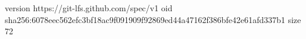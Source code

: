version https://git-lfs.github.com/spec/v1
oid sha256:6078eec562efc3bf18ac9f091909f92869ed44a47162f386bfe42e61afd337b1
size 72
